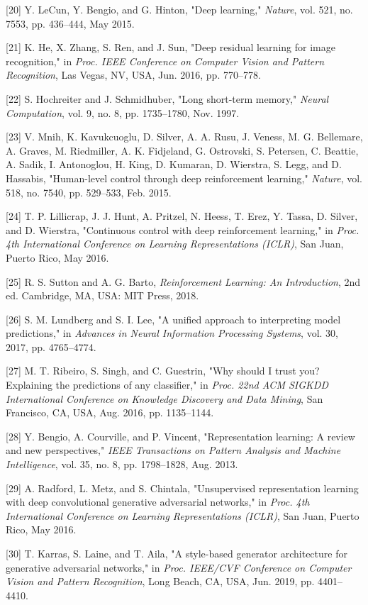 \documentclass[conference]{IEEEtran}
\begin{document}
[20] Y. LeCun, Y. Bengio, and G. Hinton, "Deep learning," \textit{Nature}, vol. 521, no. 7553, pp. 436--444, May 2015.

[21] K. He, X. Zhang, S. Ren, and J. Sun, "Deep residual learning for image recognition," in \textit{Proc. IEEE Conference on Computer Vision and Pattern Recognition}, Las Vegas, NV, USA, Jun. 2016, pp. 770--778.

[22] S. Hochreiter and J. Schmidhuber, "Long short-term memory," \textit{Neural Computation}, vol. 9, no. 8, pp. 1735--1780, Nov. 1997.

[23] V. Mnih, K. Kavukcuoglu, D. Silver, A. A. Rusu, J. Veness, M. G. Bellemare, A. Graves, M. Riedmiller, A. K. Fidjeland, G. Ostrovski, S. Petersen, C. Beattie, A. Sadik, I. Antonoglou, H. King, D. Kumaran, D. Wierstra, S. Legg, and D. Hassabis, "Human-level control through deep reinforcement learning," \textit{Nature}, vol. 518, no. 7540, pp. 529--533, Feb. 2015.

[24] T. P. Lillicrap, J. J. Hunt, A. Pritzel, N. Heess, T. Erez, Y. Tassa, D. Silver, and D. Wierstra, "Continuous control with deep reinforcement learning," in \textit{Proc. 4th International Conference on Learning Representations (ICLR)}, San Juan, Puerto Rico, May 2016.

[25] R. S. Sutton and A. G. Barto, \textit{Reinforcement Learning: An Introduction}, 2nd ed. Cambridge, MA, USA: MIT Press, 2018.

[26] S. M. Lundberg and S. I. Lee, "A unified approach to interpreting model predictions," in \textit{Advances in Neural Information Processing Systems}, vol. 30, 2017, pp. 4765--4774.

[27] M. T. Ribeiro, S. Singh, and C. Guestrin, "Why should I trust you? Explaining the predictions of any classifier," in \textit{Proc. 22nd ACM SIGKDD International Conference on Knowledge Discovery and Data Mining}, San Francisco, CA, USA, Aug. 2016, pp. 1135--1144.

[28] Y. Bengio, A. Courville, and P. Vincent, "Representation learning: A review and new perspectives," \textit{IEEE Transactions on Pattern Analysis and Machine Intelligence}, vol. 35, no. 8, pp. 1798--1828, Aug. 2013.

[29] A. Radford, L. Metz, and S. Chintala, "Unsupervised representation learning with deep convolutional generative adversarial networks," in \textit{Proc. 4th International Conference on Learning Representations (ICLR)}, San Juan, Puerto Rico, May 2016.

[30] T. Karras, S. Laine, and T. Aila, "A style-based generator architecture for generative adversarial networks," in \textit{Proc. IEEE/CVF Conference on Computer Vision and Pattern Recognition}, Long Beach, CA, USA, Jun. 2019, pp. 4401--4410.
\end{document}
